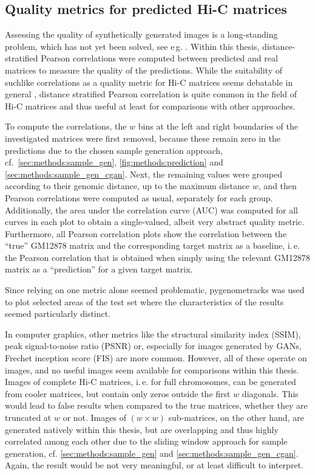 \subsection{Quality metrics for predicted Hi-C matrices}
Assessing the quality of synthetically generated images is a long-standing problem, which has not yet been solved, see e\,g. \cite[p.\,19]{Wang2020}.
Within this thesis, distance-stratified Pearson correlations were computed between predicted and real matrices to measure the quality of the predictions.
While the suitability of suchlike correlations as a quality metric for Hi-C matrices seems debatable in general \cite{Yang2017}, 
distance stratified Pearson correlation is quite common in the field of Hi-C matrices and thus useful at least for comparisons with other approaches.

To compute the correlations, the $w$ bins at the left and right boundaries of the investigated matrices were first removed, because these remain zero 
in the predictions due to the chosen sample generation approach, 
cf.~\cref{sec:methods:sample_gen}, \cref{fig:methods:prediction} and \ref{sec:methods:sample_gen_cgan}.
Next, the remaining values were grouped according to their genomic distance, up to the maximum distance $w$, 
and then Pearson correlations were computed as usual, separately for each group.
Additionally, the area under the correlation curve (AUC) was computed for all curves in each plot to obtain a single-valued, albeit very abstract quality metric.
Furthermore, all Pearson correlation plots show the correlation between the ``true'' GM12878 matrix and the corresponding target matrix as a baseline,
i.\,e. the Pearson correlation that is obtained when simply using the relevant GM12878 matrix as a ``prediction'' for a given target matrix.

Since relying on one metric alone seemed problematic, pygenometracks \cite{LopezDelisle2020} was used to plot selected areas of the test set 
where the characteristics of the results seemed particularly distinct.

In computer graphics, other metrics like the structural similarity index (SSIM), peak signal-to-noise ratio (PSNR) or, especially for images generated by GANs, 
Frechet inception score (FIS) are more common.
However, all of these operate on images, and no useful images seem available for comparisons within this thesis.
Images of complete Hi-C matrices, i.\,e. for full chromosomes,
can be generated from cooler matrices, but contain only zeros outside the first $w$ diagonals.
This would lead to false results when compared to the true matrices, whether they are truncated at $w$ or not.
Images of $(w\times w)$ sub-matrices, on the other hand, are generated natively within this thesis, but are overlapping and thus highly correlated among each other due to the sliding window approach for sample generation, 
cf. \cref{sec:methods:sample_gen} and \ref{sec:methods:sample_gen_cgan}. 
Again, the result would be not very meaningful, or at least difficult to interpret.

